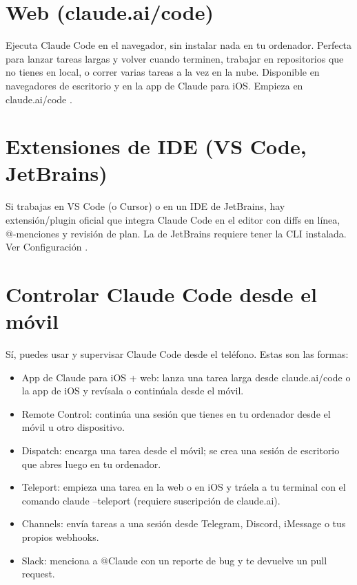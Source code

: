 \documentclass[11pt,a4paper]{book}
\begin{document}
\section{Web (claude.ai/code)}
Ejecuta Claude Code en el navegador, sin instalar nada en tu ordenador. Perfecta para lanzar tareas largas y volver cuando terminen, trabajar en repositorios que no tienes en local, o correr varias tareas a la vez en la nube. Disponible en navegadores de escritorio y en la app de Claude para iOS. Empieza en claude.ai/code .

\section{Extensiones de IDE (VS Code, JetBrains)}
Si trabajas en VS Code (o Cursor) o en un IDE de JetBrains, hay extensión/plugin oficial que integra Claude Code en el editor con diffs en línea, @-menciones y revisión de plan. La de JetBrains requiere tener la CLI instalada. Ver Configuración .

\section{Controlar Claude Code desde el móvil}
Sí, puedes usar y supervisar Claude Code desde el teléfono. Estas son las formas:

\begin{itemize}\item App de Claude para iOS + web: lanza una tarea larga desde claude.ai/code o la app de iOS y revísala o continúala desde el móvil.\end{itemize}
\begin{itemize}\item Remote Control: continúa una sesión que tienes en tu ordenador desde el móvil u otro dispositivo.\end{itemize}
\begin{itemize}\item Dispatch: encarga una tarea desde el móvil; se crea una sesión de escritorio que abres luego en tu ordenador.\end{itemize}
\begin{itemize}\item Teleport: empieza una tarea en la web o en iOS y tráela a tu terminal con el comando claude --teleport (requiere suscripción de claude.ai).\end{itemize}
\begin{itemize}\item Channels: envía tareas a una sesión desde Telegram, Discord, iMessage o tus propios webhooks.\end{itemize}
\begin{itemize}\item Slack: menciona a @Claude con un reporte de bug y te devuelve un pull request.\end{itemize}
\end{document}
